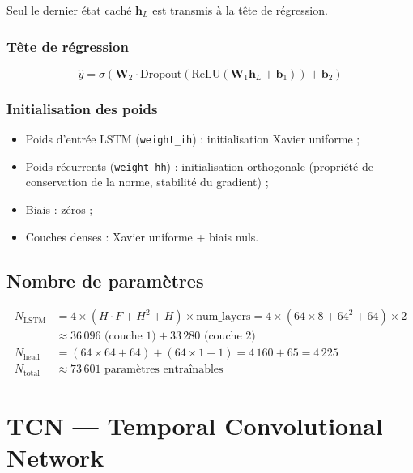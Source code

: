 \documentclass[12pt,a4paper]{report}
\begin{document}
Seul le dernier état caché $\mathbf{h}_L$ est transmis à la tête de régression.

\subsubsection{Tête de régression}

\begin{equation}
  \hat{y} = \sigma\!\left(\mathbf{W}_2 \cdot \text{Dropout}\!\left(
    \text{ReLU}\!\left(\mathbf{W}_1 \mathbf{h}_L + \mathbf{b}_1\right)
  \right) + \mathbf{b}_2\right)
\end{equation}

\subsubsection{Initialisation des poids}

\begin{itemize}[leftmargin=*]
  \item Poids d'entrée LSTM (\texttt{weight\_ih}) : initialisation Xavier uniforme ;
  \item Poids récurrents (\texttt{weight\_hh}) : initialisation orthogonale (propriété
        de conservation de la norme, stabilité du gradient) ;
  \item Biais : zéros ;
  \item Couches denses : Xavier uniforme + biais nuls.
\end{itemize}

\subsection{Nombre de paramètres}

\begin{align*}
  N_\text{LSTM} &= 4 \times (H \cdot F + H^2 + H) \times \text{num\_layers} = 4 \times (64 \times 8 + 64^2 + 64) \times 2 \\
                &\approx 36\,096 \text{ (couche 1)} + 33\,280 \text{ (couche 2)} \\
  N_\text{head} &= (64 \times 64 + 64) + (64 \times 1 + 1) = 4\,160 + 65 = 4\,225 \\
  N_\text{total} &\approx 73\,601 \text{ paramètres entraînables}
\end{align*}

\section{TCN — Temporal Convolutional Network}
\label{sec:tcn}
\end{document}
